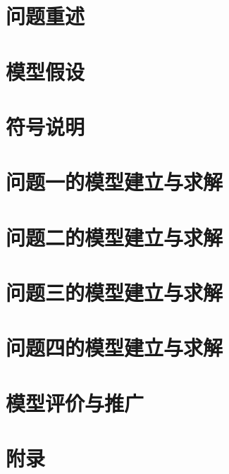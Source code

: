 \documentclass[withoutpreface,bwprint,AutoFakeBold, AutoFakeSlant]{cumcmthesis}    %
\begin{document}
% 
\maketitle
    
    

\section{问题重述}
    
    
\section{模型假设}
    
    
\section{符号说明}
    
    
\section{问题一的模型建立与求解}
    
    
\section{问题二的模型建立与求解}
    
    
\section{问题三的模型建立与求解}
    

\section{问题四的模型建立与求解}
    
    
\section{模型评价与推广}
    

\clearpage

    
\clearpage

\section{附录}\appendix
    
\end{document}
